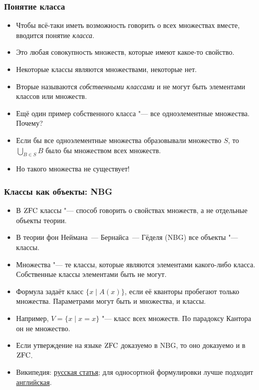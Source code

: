 \documentclass[10pt]{beamer}
\begin{document}
\begin{frame}
    \frametitle{Понятие класса}
    \begin{itemize}
        \item Чтобы всё-таки иметь возможность говорить о всех множествах вместе, вводится понятие \emph{класса}.
        \item Это любая совокупность множеств, которые имеют какое-то свойство.
        \item Некоторые классы являются множествами, некоторые нет. 
        \item Вторые называются \emph{собственными классами} и не могут быть элементами классов или множеств.
        \item Ещё один пример собственного класса "--- все одноэлементные множества. Почему?
        \pause
        \item Если бы все одноэлементные множества образовывали множество $S$, то $\bigcup_{B\in S}B$ было бы множеством всех множеств.
        \item Но такого множества не существует!
    \end{itemize}
\end{frame}

\begin{frame}
    \frametitle{Классы как объекты: NBG}
    \begin{itemize}
        \item В $\mathrm{ZFC}$ классы "--- способ говорить о свойствах множеств, а не отдельные объекты теории.
        \item В теории фон Неймана~--- Бернайса~--- Гёделя (NBG) все объекты "--- классы.
        \item Множества "--- те классы, которые являются элементами какого-либо класса. Собственные классы элементами быть не могут.
        \item Формула задаёт класс $\{x\mid A(x)\}$, если её кванторы пробегают только множества. Параметрами могут быть и множества, и классы.
        \pause
        \item Например, $V=\{x\mid x=x\}$ "--- класс всех множеств. По парадоксу Кантора он не множество.
        \item Если утверждение на языке $\mathrm{ZFC}$ доказуемо в NBG, то оно доказуемо и в $\mathrm{ZFC}$.
        \item Википедия: \href{https://ru.wikipedia.org/wiki/\%D0\%A1\%D0\%B8\%D1\%81\%D1\%82\%D0\%B5\%D0\%BC\%D0\%B0_\%D0\%B0\%D0\%BA\%D1\%81\%D0\%B8\%D0\%BE\%D0\%BC_\%D1\%84\%D0\%BE\%D0\%BD_\%D0\%9D\%D0\%B5\%D0\%B9\%D0\%BC\%D0\%B0\%D0\%BD\%D0\%B0_\%E2\%80\%94_\%D0\%91\%D0\%B5\%D1\%80\%D0\%BD\%D0\%B0\%D0\%B9\%D1\%81\%D0\%B0_\%E2\%80\%94_\%D0\%93\%D1\%91\%D0\%B4\%D0\%B5\%D0\%BB\%D1\%8F}{русская статья}; для односортной формулировки лучше подходит \href{https://en.wikipedia.org/wiki/Von_Neumann\%E2\%80\%93Bernays\%E2\%80\%93G\%C3\%B6del_set_theory}{английская}.
    \end{itemize}
\end{frame}
\end{document}
